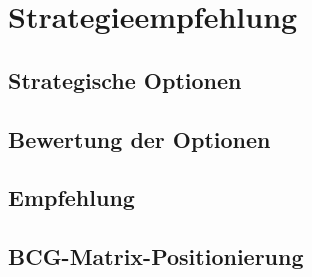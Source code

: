 \chapter{Strategieempfehlung}\label{chap:strategie}

\section{Strategische Optionen}\label{sec:optionen}

\section{Bewertung der Optionen}\label{sec:bewertung}

\section{Empfehlung}\label{sec:empfehlung}

\section{BCG-Matrix-Positionierung}\label{sec:bcg}
